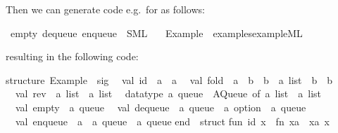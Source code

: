 \begin{isabellebody}
\endisatagquote
{\isafoldquote}%
%
\isadelimquote
%
\endisadelimquote
%
\isadeliminvisible
%
\endisadeliminvisible
%
\isataginvisible
%
\endisataginvisible
{\isafoldinvisible}%
%
\isadeliminvisible
%
\endisadeliminvisible
%
\begin{isamarkuptext}%
\noindent Then we can generate code e.g.~for  as follows:%
\end{isamarkuptext}%
\isamarkuptrue%
%
\isadelimquote
%
\endisadelimquote
%
\isatagquote
{}\isamarkupfalse%
\ empty\ dequeue\ enqueue\ \ SML\isanewline
\ \ \ Example\ \ {\isachardoublequoteopen}examples{\isacharslash}example{\isachardot}ML{\isachardoublequoteclose}%
\endisatagquote
{\isafoldquote}%
%
\isadelimquote
%
\endisadelimquote
%
\begin{isamarkuptext}%
\noindent resulting in the following code:%
\end{isamarkuptext}%
\isamarkuptrue%
%
\isadelimquotetypewriter
%
\endisadelimquotetypewriter
%
\isatagquotetypewriter
%
\begin{isamarkuptext}%
structure\ Example\ {\isacharcolon}\ sig\isanewline
\ \ val\ id\ {\isacharcolon}\ {\isacharprime}a\ {\isacharminus}{\isachargreater}\ {\isacharprime}a\isanewline
\ \ val\ fold\ {\isacharcolon}\ {\isacharparenleft}{\isacharprime}a\ {\isacharminus}{\isachargreater}\ {\isacharprime}b\ {\isacharminus}{\isachargreater}\ {\isacharprime}b{\isacharparenright}\ {\isacharminus}{\isachargreater}\ {\isacharprime}a\ list\ {\isacharminus}{\isachargreater}\ {\isacharprime}b\ {\isacharminus}{\isachargreater}\ {\isacharprime}b\isanewline
\ \ val\ rev\ {\isacharcolon}\ {\isacharprime}a\ list\ {\isacharminus}{\isachargreater}\ {\isacharprime}a\ list\isanewline
\ \ datatype\ {\isacharprime}a\ queue\ {\isacharequal}\ AQueue\ of\ {\isacharprime}a\ list\ {\isacharasterisk}\ {\isacharprime}a\ list\isanewline
\ \ val\ empty\ {\isacharcolon}\ {\isacharprime}a\ queue\isanewline
\ \ val\ dequeue\ {\isacharcolon}\ {\isacharprime}a\ queue\ {\isacharminus}{\isachargreater}\ {\isacharprime}a\ option\ {\isacharasterisk}\ {\isacharprime}a\ queue\isanewline
\ \ val\ enqueue\ {\isacharcolon}\ {\isacharprime}a\ {\isacharminus}{\isachargreater}\ {\isacharprime}a\ queue\ {\isacharminus}{\isachargreater}\ {\isacharprime}a\ queue\isanewline
end\ {\isacharequal}\ struct\isanewline
\isanewline
fun\ id\ x\ {\isacharequal}\ {\isacharparenleft}fn\ xa\ {\isacharequal}{\isachargreater}\ xa{\isacharparenright}\ x{\isacharsemicolon}\isanewline
\isanewline

\end{isamarkuptext}
\end{isabellebody}
